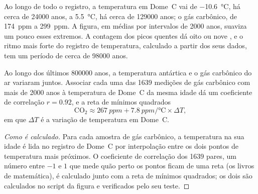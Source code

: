 Ao longo de todo o registro, a temperatura em Dome~C vai de
\qty{-10.6}{\degreeCelsius}, há cerca de \num{24000} anos, a
\qty{+5.5}{\degreeCelsius}, há cerca de \num{129000} anos; o gás carbônico,
de \qty{174}{ppm} a \qty{299}{ppm}. A figura, em médias por intervalos de
\num{2000} anos, suaviza um pouco esses extremos. A contagem dos picos
quentes dá oito ou nove , e o ritmo mais forte do registro de
temperatura, calculado a partir dos seus dados, tem um período de cerca de
\num{98000} anos.

\begin{proposition}\label{prop:g12:past-climates:correlation}
Ao longo dos últimos \num{800000} anos, a temperatura antártica e o gás
carbônico do ar variaram juntos. Associar cada uma das 1639 medições de gás
carbônico com mais de \num{2000} anos à temperatura de Dome~C da mesma idade
dá um coeficiente de correlação $r = 0.92$, e a
reta de mínimos quadrados
\[
  \mathrm{CO_2} \approx \qty{267}{ppm} + \qty{7.8}{ppm/\degreeCelsius} \times \Delta T ,
\]
em que $\Delta T$ é a variação de temperatura em Dome~C.
\end{proposition}

\begin{proof}[Como é calculado]
Para cada amostra de gás carbônico, a temperatura na sua idade é lida no
registro de Dome~C por interpolação entre os dois pontos de temperatura mais
próximos. O coeficiente de correlação dos 1639 pares, um número entre $-1$ e
$1$ que mede quão perto os pontos ficam de uma reta (os livros de
matemática), é calculado junto com a reta de mínimos quadrados; os dois são
calculados no script da figura e verificados pelo seu teste.
\end{proof}

